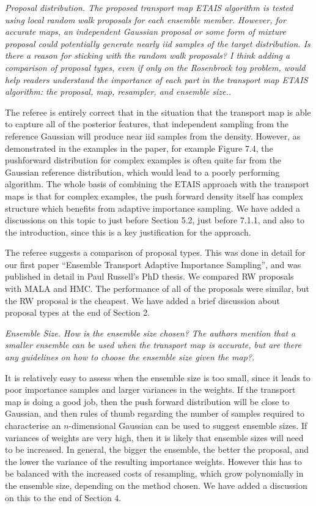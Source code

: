 \documentclass{article}
\newcommand{\comment}[2]{\vspace{0.6cm}{\bf Comment:} {\it #1.}

\vspace{0.3cm}{\bf Answer:} #2}
\begin{document}

\comment{Proposal distribution. The proposed transport map ETAIS algorithm is tested using local random walk proposals for each ensemble member. However, for accurate maps, an independent Gaussian proposal or some form of mixture proposal could potentially generate nearly iid samples of the target distribution. Is there a reason for sticking with the random walk proposals? I think adding a comparison of proposal types, even if only on the Rosenbrock toy problem, would help readers understand the importance of each part in the transport map ETAIS algorithm: the proposal, map, resampler, and ensemble size.}{The referee is entirely correct that in the situation that the transport map is able to capture all of the posterior features, that independent sampling from the reference Gaussian will produce near iid samples from the density. However, as demonstrated in the examples in the paper, for example Figure 7.4, the pushforward distribution for complex examples is often quite far from the Gaussian reference distribution, which would lead to a poorly performing algorithm. The whole basis of combining the ETAIS approach with the transport maps is that for complex examples, the push forward density itself has complex structure which benefits from adaptive importance sampling. We have added a discussions on this topic to just before Section 5.2, just before 7.1.1, and also to the introduction, since this is a key justification for the approach.

The referee suggests a comparison of proposal types. This was done in detail for our first paper ``Ensemble Transport Adaptive Importance Sampling'', and was published in detail in Paul Russell's PhD thesis. We compared RW proposals with MALA and HMC. The performance of all of the proposals were similar, but the RW proposal is the cheapest. We have added a brief discussion about proposal types at the end of Section 2.}


\comment{Ensemble Size. How is the ensemble size chosen? The authors mention that a smaller ensemble can be used when the transport map is accurate, but are there any guidelines on how to choose the ensemble size given the map?}{It is relatively easy to assess when the ensemble size is too small, since it leads to poor importance samples and larger variances in the weights. If the transport map is doing a good job, then the push forward distribution will be close to Gaussian, and then rules of thumb regarding the number of samples required to characterise an $n$-dimensional Gaussian can be used to suggest ensemble sizes. If variances of weights are very high, then it is likely that ensemble sizes will need to be increased. In general, the bigger the ensemble, the better the proposal, and the lower the variance of the resulting importance weights. However this has to be balanced with the increased costs of resampling, which grow polynomially in the ensemble size, depending on the method chosen. We have added a discussion on this to the end of Section 4.}
\end{document}
